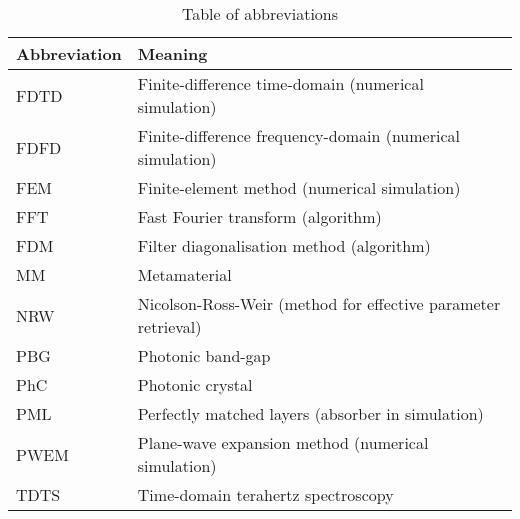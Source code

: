 \begin{table}[ht]   \caption{Table of abbreviations}  \label{tb_shortcuts} \centering 
\begin{tabular}{ll}
 \toprule
Abbreviation & Meaning	\\
 \hline
FDTD 		& Finite-difference time-domain (numerical simulation)\\
FDFD 		& Finite-difference frequency-domain (numerical simulation)\\
FEM 		& Finite-element method (numerical simulation)\\
FFT 		& Fast Fourier transform (algorithm)\\
FDM 		& Filter diagonalisation method (algorithm)\\
MM		& Metamaterial\\
NRW 		& Nicolson-Ross-Weir (method for effective parameter retrieval)\\
PBG		& Photonic band-gap\\
PhC 		& Photonic crystal\\
PML 		& Perfectly matched layers (absorber in simulation)\\
PWEM 		& Plane-wave expansion method (numerical simulation)\\
TDTS 		& Time-domain terahertz spectroscopy\\
 \bottomrule
 \end{tabular} \end{table}


